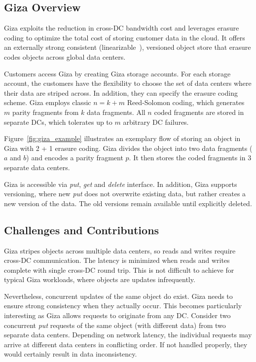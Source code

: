 \subsection{Giza Overview}

Giza exploits the reduction in cross-DC bandwidth cost and leverages erasure coding to optimize the total cost of storing customer data in the cloud. It offers an externally strong consistent (linearizable~\cite{herlihy90linearizability}), versioned object store that erasure codes objects across global data centers.

Customers access Giza by creating Giza storage accounts. For each storage account, the customers have the flexibility to choose the set of data centers where their data are striped across. In addition, they can specify the erasure coding scheme. Giza employs classic $n = k + m$ Reed-Solomon coding, which generates $m$ parity fragments from $k$ data fragments. All $n$ coded fragments are stored in separate DCs, which tolerates up to $m$ arbitrary DC failures.

Figure~\ref{fig:giza_example} illustrates an exemplary flow of storing an object in Giza with 2 + 1 erasure coding. Giza divides the object into two data fragments ($a$ and $b$) and encodes a parity fragment $p$. It then stores the coded fragments in $3$ separate data centers. 

Giza is accessible via {\em put}, {\em get} and {\em delete} interface. In addition, Giza supports versioning, where new {\em put} does not overwrite existing data, but rather creates a new version of the data. The old versions remain available until explicitly deleted.

\subsection{Challenges and Contributions}

Giza stripes objects across multiple data centers, so reads and writes require cross-DC communication. The latency is minimized when reads and writes complete with single cross-DC round trip. This is not difficult to achieve for typical Giza workloads, where objects are updates infrequently.

Nevertheless, concurrent updates of the same object do exist. Giza needs to ensure strong consistency when they actually occur. This becomes particularly interesting as Giza allows requests to originate from any DC. Consider two concurrent {\em put} requests of the same object (with different data) from two separate data centers. Depending on network latency, the individual requests may arrive at different data centers in conflicting order. If not handled properly, they would certainly result in data inconsistency. 

